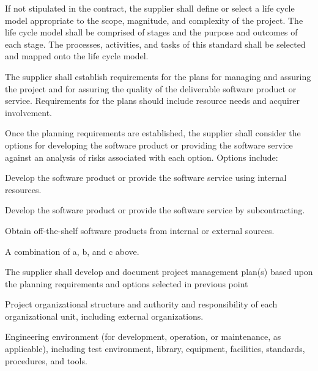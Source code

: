 \begin{adjustwidth}{2em}{0pt}
\begin{compactenum}
\begin{compactenum}
						\item If not stipulated in the contract, the supplier shall define or select a life cycle model appropriate to the scope, magnitude, and complexity of the project. The life cycle model shall be comprised of stages and the purpose and outcomes of each stage. The processes, activities, and tasks of this standard shall be selected and mapped onto the life cycle model.

						\item The supplier shall establish requirements for the plans for managing and assuring the project and for assuring the quality of the deliverable software product or service. Requirements for the plans should include resource needs and acquirer involvement.

						\item Once the planning requirements are established, the supplier shall consider the options for developing the software product or providing the software service against an analysis of risks associated with each option. Options include:

						\begin{compactenum}

							\item Develop the software product or provide the software service using internal resources.

							\item Develop the software product or provide the software service by subcontracting.

							\item Obtain off-the-shelf software products from internal or external sources.

							\item A combination of a, b, and c above.

						\end{compactenum}

						\item The supplier shall develop and document project management plan(s) based upon the planning requirements and options selected in previous point

						\begin{compactenum}

							\item Project organizational structure and authority and responsibility of each organizational unit, including external organizations.

							\item Engineering environment (for development, operation, or maintenance, as applicable), including test environment, library, equipment, facilities, standards, procedures, and tools.


\end{compactenum}
\end{compactenum}
\end{compactenum}
\end{adjustwidth}
